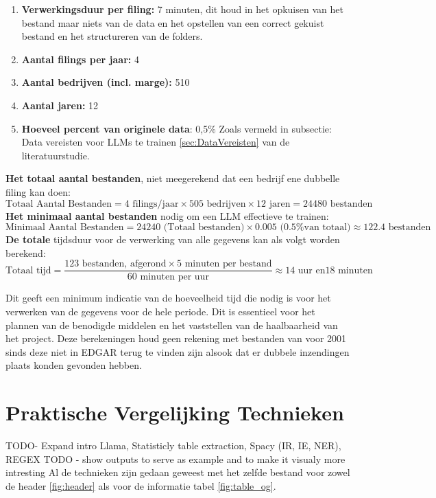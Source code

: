 \begin{enumerate}
    \item \textbf{Verwerkingsduur per filing:} 7 minuten, dit houd in het opkuisen van het bestand maar niets van de data en het opstellen van een correct gekuist bestand en het structureren van de folders.
    \item \textbf{Aantal filings per jaar:} 4
    \item \textbf{Aantal bedrijven (incl. marge):} 510
    \item \textbf{Aantal jaren:} 12
    \item \textbf{Hoeveel percent van originele data}: 0,5\% Zoals vermeld in subsectie: Data vereisten voor LLMs te trainen \ref{sec:DataVereisten} van de literatuurstudie.
\end{enumerate}

\textbf{Het totaal aantal bestanden}, niet meegerekend dat een bedrijf ene dubbelle filing kan doen:
\[
\text{Totaal Aantal Bestanden} = 4 \text{ filings/jaar} \times 505 \text{ bedrijven} \times 12 \text{ jaren} = 24480 \text{ bestanden}
\]
\textbf{Het minimaal aantal bestanden} nodig om een LLM effectieve te trainen:
\[
\text{Minimaal Aantal Bestanden} = 24240 \text{ (Totaal bestanden)} \times 0.005 \text{ (0.5\% van totaal)} \approx 122.4 \text{ bestanden}
\]
\textbf{De totale} tijdsduur voor de verwerking van alle gegevens kan als volgt worden berekend:
\[
\text{Totaal tijd} = \frac{123 \text{ bestanden, afgerond} \times 5 \text{ minuten per bestand}}{60 \text{ minuten per uur}} \approx 14 \text{ uur en}  18 \text{ minuten}
\]

Dit geeft een minimum indicatie van de hoeveelheid tijd die nodig is voor het verwerken van de gegevens voor de hele periode. Dit is essentieel voor het plannen van de benodigde middelen en het vaststellen van de haalbaarheid van het project. Deze berekeningen houd geen rekening met bestanden van voor 2001 sinds deze niet in EDGAR terug te vinden zijn alsook dat er dubbele inzendingen plaats konden gevonden hebben.



\section{Praktische Vergelijking Technieken}
TODO- Expand intro
Llama, Statisticly table extraction, Spacy (IR, IE, NER), REGEX
TODO - show outputs to serve as example and to make it visualy more intresting
Al de technieken zijn gedaan geweest met het zelfde bestand voor zowel de header \autoref{fig:header} als voor de informatie tabel \autoref{fig:table_og}.
